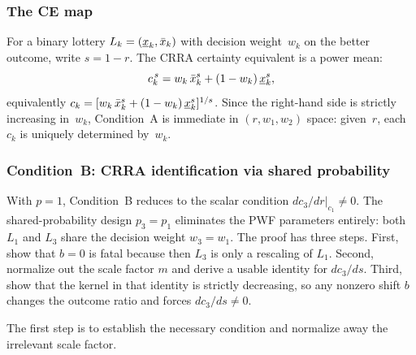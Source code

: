\subsubsection{The CE map}
\label{appB:ce_function}

For a binary lottery $L_k = (\underline{x}_k, \bar{x}_k)$ with decision
weight~$w_k$ on the better outcome, write $s = 1 - r$. The CRRA
certainty equivalent is a power mean:
\begin{equation}
  \label{eq:ce_decomp}
  c_k^{\,s} = w_k\, \bar{x}_k^s + (1 - w_k)\, \underline{x}_k^s,
\end{equation}
equivalently $c_k = [w_k\, \bar{x}_k^s + (1-w_k)\, \underline{x}_k^s]^{1/s}$.
Since the right-hand side is strictly increasing in~$w_k$,
Condition~A is immediate in $(r, w_1, w_2)$ space: given~$r$,
each $c_k$ is uniquely determined by~$w_k$.

\subsubsection{Condition~B: CRRA identification via shared probability}
\label{appB:cond_b_crra}

With $p = 1$, Condition~B reduces to the scalar condition
$dc_3/dr\big|_{c_1} \neq 0$. The shared-probability design
$p_3 = p_1$ eliminates the PWF parameters entirely:
both $L_1$ and $L_3$ share the decision weight $w_3 = w_1$.
The proof has three steps. First, show that $b = 0$ is fatal because then
$L_3$ is only a rescaling of $L_1$. Second, normalize out the scale factor
$m$ and derive a usable identity for $dc_3/ds$. Third, show that the kernel
in that identity is strictly decreasing, so any nonzero shift $b$ changes the
outcome ratio and forces $dc_3/ds \neq 0$.

The first step is to establish the necessary condition and normalize away the
irrelevant scale factor.

